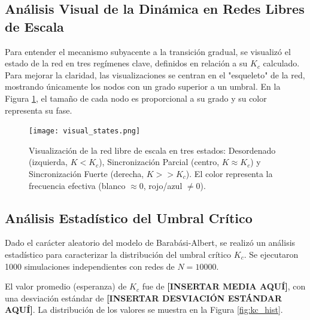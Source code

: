\documentclass[12pt, a4paper]{article}
\begin{document}
\subsection{Análisis Visual de la Dinámica en Redes Libres de Escala}

Para entender el mecanismo subyacente a la transición gradual, se visualizó el estado de la red en tres regímenes clave, definidos en relación a su \(K_c\) calculado. Para mejorar la claridad, las visualizaciones se centran en el "esqueleto" de la red, mostrando únicamente los nodos con un grado superior a un umbral. En la Figura \ref{fig:visual_states}, el tamaño de cada nodo es proporcional a su grado y su color representa su fase.

\begin{figure}[h!]
    \centering
    \texttt{[image: visual\_states.png]}
    \caption{Visualización de la red libre de escala en tres estados: Desordenado (izquierda, \(K < K_c\)), Sincronización Parcial (centro, \(K \approx K_c\)) y Sincronización Fuerte (derecha, \(K >> K_c\)). El color representa la frecuencia efectiva (blanco \(\approx 0\), rojo/azul \(\neq 0\)).}
    \label{fig:visual_states}
\end{figure}

\subsection{Análisis Estadístico del Umbral Crítico}

Dado el carácter aleatorio del modelo de Barabási-Albert, se realizó un análisis estadístico para caracterizar la distribución del umbral crítico \(K_c\). Se ejecutaron 1000 simulaciones independientes con redes de \(N=10000\).

El valor promedio (esperanza) de \(K_c\) fue de \textbf{[INSERTAR MEDIA AQUÍ]}, con una desviación estándar de \textbf{[INSERTAR DESVIACIÓN ESTÁNDAR AQUÍ]}. La distribución de los valores se muestra en la Figura \ref{fig:kc_hist}.
\end{document}
